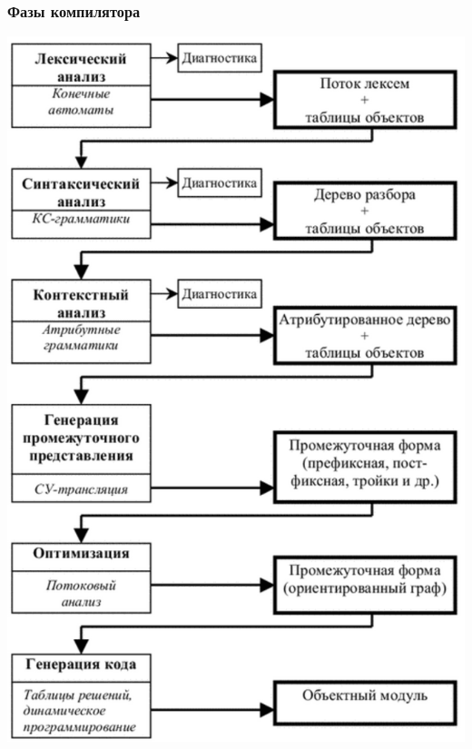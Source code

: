 \documentclass{../../slides-style}
\begin{document}
    \begin{frame}
        \frametitle{Фазы компилятора}
        \begin{center}
            \includegraphics[height=0.8\textheight]{compilerPhases.png}
        \end{center}
    \end{frame}
\end{document}
